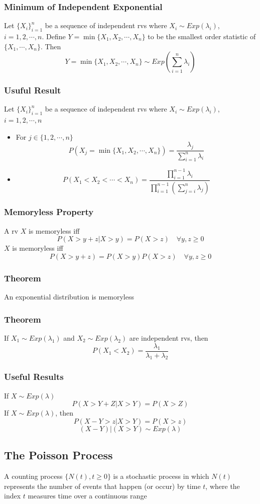 \documentclass[11pt]{article}
\begin{document}
\subsubsection*{Minimum of Independent Exponential}
Let $\{X_i\}_{i=1}^n$ be a sequence of independent rvs where $X_i\sim Exp(\lambda_i)$, $i=1,2,\cdots,n$. Define $Y=\min\{X_1,X_2,\cdots,X_n\}$ to be the smallest order statistic of $\{X_1,\cdots,X_n\}$. Then 
\[Y=\min\{X_1,X_2,\cdots,X_n\}\sim Exp(\sum_{i=1}^{n}\lambda_i)\]
\subsubsection*{Usuful Result}
Let $\{X_i\}_{i=1}^n$ be a sequence of independent rvs where $X_i\sim Exp(\lambda_i)$, $i=1,2,\cdots,n$ 
\begin{itemize}
    \item For $j\in\{1,2,\cdots,n\}$ \[P(X_j = \min\{X_1,X_2,\cdots,X_n\})  = \frac{\lambda_j}{\sum_{i=1}^{n}\lambda_i}\]
    \item \[P(X_1<X_2<\cdots<X_n) = \frac{\prod_{i=1}^{n-1}\lambda_i}{\prod_{i=1}^{n-1}\left(\sum_{j=i}^{n}\lambda_j\right)}\]
\end{itemize}
\subsubsection{Memoryless Property}
A rv $X$ is memoryless iff 
\[P(X>y+z|X>y) = P(X>z)\quad\forall y,z\geq 0\]
$X$ is memoryless iff 
\[P(X>y+z) = P(X>y)P(X>z)\quad\forall y,z\geq 0\]
\subsubsection*{Theorem}
An exponential distribution is memoryless
\subsubsection*{Theorem}
If $X_1\sim Exp(\lambda_1)$ and $X_2\sim Exp(\lambda_2)$ are independent rvs, then
\[P(X_1<X_2) = \frac{\lambda_1}{\lambda_1+\lambda_2}\] 
\subsubsection*{Useful Results}
If $X\sim Exp(\lambda)$
\[P(X>Y+Z|X>Y) = P(X>Z)\]
If $X\sim Exp(\lambda)$, then 
\[P(X-Y>z|X>Y) = P(X>z)\]
\[(X-Y)|(X>Y)\sim Exp(\lambda)\]
\subsection{The Poisson Process}
A counting process $\{N(t),t\geq0\}$ is a stochastic process in which $N(t)$ represents the number of events that happen (or occur) by time $t$, where the index $t$ measures time over a continuous range 
\end{document}
